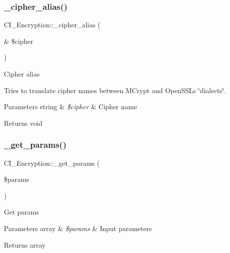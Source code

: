 \subsubsection{\texorpdfstring{\+\_\+cipher\+\_\+alias()}{\_cipher\_alias()}}
{\footnotesize\ttfamily C\+I\+\_\+\+Encryption\+::\+\_\+cipher\+\_\+alias (\begin{DoxyParamCaption}\item[{\&}]{\$cipher }\end{DoxyParamCaption})\hspace{0.3cm}{\ttfamily [protected]}}

Cipher alias

Tries to translate cipher names between M\+Crypt and Open\+S\+SL\textquotesingle{}s \char`\"{}dialects\char`\"{}.


\begin{DoxyParams}[1]{Parameters}
string & {\em \$cipher} & Cipher name \\
\hline
\end{DoxyParams}
\begin{DoxyReturn}{Returns}
void 
\end{DoxyReturn}
\mbox{\label{class_c_i___encryption_ad3cef0865a67dc48047e4063a112b294}} 
\subsubsection{\texorpdfstring{\+\_\+get\+\_\+params()}{\_get\_params()}}
{\footnotesize\ttfamily C\+I\+\_\+\+Encryption\+::\+\_\+get\+\_\+params (\begin{DoxyParamCaption}\item[{}]{\$params }\end{DoxyParamCaption})\hspace{0.3cm}{\ttfamily [protected]}}

Get params


\begin{DoxyParams}[1]{Parameters}
array & {\em \$params} & Input parameters \\
\hline
\end{DoxyParams}
\begin{DoxyReturn}{Returns}
array 
\end{DoxyReturn}
\mbox{\label{class_c_i___encryption_adaac8d93c78040dd12869e9f868c0fef}} 
